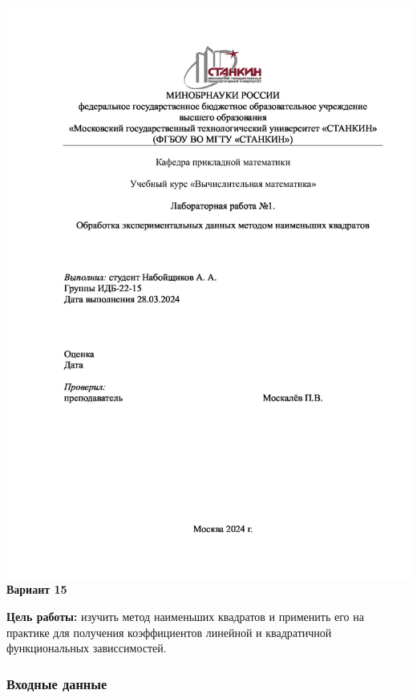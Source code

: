 \documentclass[
  letterpaper,
  DIV=11,
  numbers=noendperiod]{scrartcl}
\author{}
\date{}
\begin{document}
\ifdefined\Shaded\renewenvironment{Shaded}{\begin{tcolorbox}[interior hidden, breakable, frame hidden, sharp corners, enhanced, boxrule=0pt, borderline west={3pt}{0pt}{shadecolor}]}{\end{tcolorbox}}\fi

\includegraphics{./Титульник.jpeg} \textbf{Вариант 15}

\textbf{Цель работы:} изучить метод наименьших квадратов и применить его
на практике для получения коэффициентов линейной и квадратичной
функциональных зависсимостей.

\subsubsection{Входные
данные}\label{ux432ux445ux43eux434ux43dux44bux435-ux434ux430ux43dux43dux44bux435}
\end{document}
